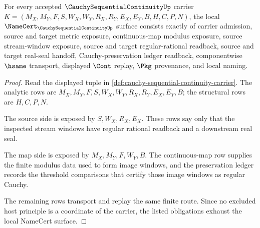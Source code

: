 \begin{theorem}
\label{thm:cauchy-sequential-continuity-namecert-obligations}
For every accepted $\CauchySequentialContinuityUp$ carrier $K=(M_X,M_Y,F,S,W_X,W_Y,R_X,R_Y,E_X,E_Y,B,H,C,P,N)$, the local $\NameCert_{\CauchySequentialContinuityUp}$ surface consists exactly of carrier admission, source and target metric exposure, continuous-map modulus exposure, source stream-window exposure, source and target regular-rational readback, source and target real-seal handoff, Cauchy-preservation ledger readback, componentwise $\hsame$ transport, displayed $\Cont$ replay, $\Pkg$ provenance, and local naming.
\end{theorem}
\begin{proof}
Read the displayed tuple in \autoref{def:cauchy-sequential-continuity-carrier}. The analytic rows are $M_X,M_Y,F,S,W_X,W_Y,R_X,R_Y,E_X,E_Y,B$; the structural rows are $H,C,P,N$.

The source side is exposed by $S,W_X,R_X,E_X$. These rows say only that the inspected stream windows have regular rational readback and a downstream real seal.

The map side is exposed by $M_X,M_Y,F,W_Y,B$. The continuous-map row supplies the finite modulus data used to form image windows, and the preservation ledger records the threshold comparisons that certify those image windows as regular Cauchy.

The remaining rows transport and replay the same finite route. Since no excluded host principle is a coordinate of the carrier, the listed obligations exhaust the local NameCert surface.
\end{proof}


\begin{closurestatus}{\CauchySequentialContinuityUp}
  \theoryclosure{\seedClosure}
  \formalstatus{\unformalizedV}
\end{closurestatus}
